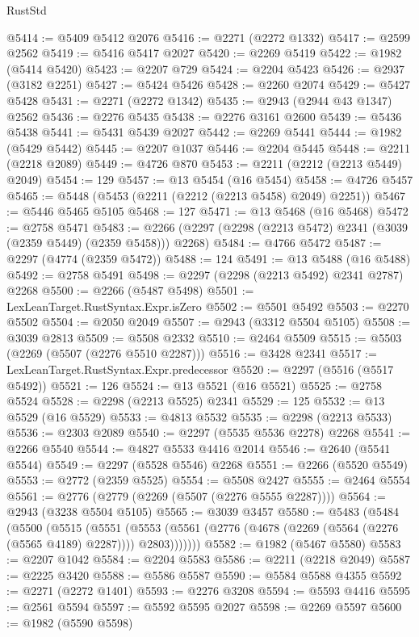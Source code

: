 \begin{lexlean}{RustStd}
\begin{coremodule}
@5414 := @5409 @5412 @2076
@5416 := @2271 (@2272 @1332)
@5417 := @2599 @2562
@5419 := @5416 @5417 @2027
@5420 := @2269 @5419
@5422 := @1982 (@5414 @5420)
@5423 := @2207 @729
@5424 := @2204 @5423
@5426 := @2937 (@3182 @2251)
@5427 := @5424 @5426
@5428 := @2260 @2074
@5429 := @5427 @5428
@5431 := @2271 (@2272 @1342)
@5435 := @2943 (@2944 @43 @1347) @2562
@5436 := @2276 @5435
@5438 := @2276 @3161 @2600
@5439 := @5436 @5438
@5441 := @5431 @5439 @2027
@5442 := @2269 @5441
@5444 := @1982 (@5429 @5442)
@5445 := @2207 @1037
@5446 := @2204 @5445
@5448 := @2211 (@2218 @2089)
@5449 := @4726 @870
@5453 := @2211 (@2212 (@2213 @5449) @2049)
@5454 := 129
@5457 := @13 @5454 (@16 @5454)
@5458 := @4726 @5457
@5465 := @5448 (@5453 (@2211 (@2212 (@2213 @5458) @2049) @2251))
@5467 := @5446 @5465 @5105
@5468 := 127
@5471 := @13 @5468 (@16 @5468)
@5472 := @2758 @5471
@5483 := @2266 (@2297 (@2298 (@2213 @5472) @2341 (@3039 (@2359 @5449) (@2359 @5458))) @2268)
@5484 := @4766 @5472
@5487 := @2297 (@4774 (@2359 @5472))
@5488 := 124
@5491 := @13 @5488 (@16 @5488)
@5492 := @2758 @5491
@5498 := @2297 (@2298 (@2213 @5492) @2341 @2787) @2268
@5500 := @2266 (@5487 @5498)
@5501 := LexLeanTarget.RustSyntax.Expr.isZero
@5502 := @5501 @5492
@5503 := @2270 @5502
@5504 := @2050 @2049
@5507 := @2943 (@3312 @5504 @5105)
@5508 := @3039 @2813
@5509 := @5508 @2332
@5510 := @2464 @5509
@5515 := @5503 (@2269 (@5507 (@2276 @5510 @2287)))
@5516 := @3428 @2341
@5517 := LexLeanTarget.RustSyntax.Expr.predecessor
@5520 := @2297 (@5516 (@5517 @5492))
@5521 := 126
@5524 := @13 @5521 (@16 @5521)
@5525 := @2758 @5524
@5528 := @2298 (@2213 @5525) @2341
@5529 := 125
@5532 := @13 @5529 (@16 @5529)
@5533 := @4813 @5532
@5535 := @2298 (@2213 @5533)
@5536 := @2303 @2089
@5540 := @2297 (@5535 @5536 @2278) @2268
@5541 := @2266 @5540
@5544 := @4827 @5533 @4416 @2014
@5546 := @2640 (@5541 @5544)
@5549 := @2297 (@5528 @5546) @2268
@5551 := @2266 (@5520 @5549)
@5553 := @2772 (@2359 @5525)
@5554 := @5508 @2427
@5555 := @2464 @5554
@5561 := @2776 (@2779 (@2269 (@5507 (@2276 @5555 @2287))))
@5564 := @2943 (@3238 @5504 @5105)
@5565 := @3039 @3457
@5580 := @5483
    (@5484
      (@5500
        (@5515
          (@5551
            (@5553 (@5561 (@2776 (@4678 (@2269 (@5564 (@2276 (@5565 @4189) @2287)))) @2803)))))))
@5582 := @1982 (@5467 @5580)
@5583 := @2207 @1042
@5584 := @2204 @5583
@5586 := @2211 (@2218 @2049)
@5587 := @2225 @3420
@5588 := @5586 @5587
@5590 := @5584 @5588 @4355
@5592 := @2271 (@2272 @1401)
@5593 := @2276 @3208
@5594 := @5593 @4416
@5595 := @2561 @5594
@5597 := @5592 @5595 @2027
@5598 := @2269 @5597
@5600 := @1982 (@5590 @5598)

\end{coremodule}
\end{lexlean}
